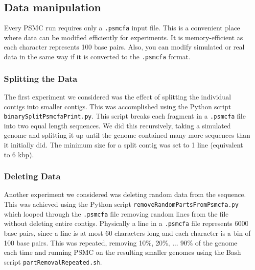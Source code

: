 \documentclass[11pt,a4paper]{article}
\begin{document}
\subsection{Data manipulation} 
Every PSMC run requires only a \verb|.psmcfa| input file. This is a convenient place where data can be modified efficiently for experiments. It is memory-efficient as each character represents 100 base pairs. Also, you can modify simulated or real data in the same way if it is converted to the \verb|.psmcfa| format.

\subsubsection{Splitting the Data}
The first experiment we considered was the effect of splitting the individual contigs into smaller contigs. This was accomplished using the Python script \verb|binarySplitPsmcfaPrint.py|. This script breaks each fragment in a \verb|.psmcfa| file into two equal length sequences. We did this recursively, taking a simulated genome and splitting it up until the genome contained many more sequences than it initially did. The minimum size for a split contig was set to 1 line (equivalent to 6 kbp).


\subsubsection{Deleting Data}
Another experiment we considered was deleting random data from the sequence. This was achieved using the Python script \verb|removeRandomPartsFromPsmcfa.py| which looped through the \verb|.psmcfa| file removing random lines from the file without deleting entire contigs. Physically a line in a \verb|.psmcfa| file represents 6000 base pairs, since a line is at most 60 characters long and each character is a bin of 100 base pairs. This was repeated, removing 10\%, 20\%, ... 90\% of the genome each time and running PSMC on the resulting smaller genomes using the Bash script \verb|partRemovalRepeated.sh|.
\end{document}
